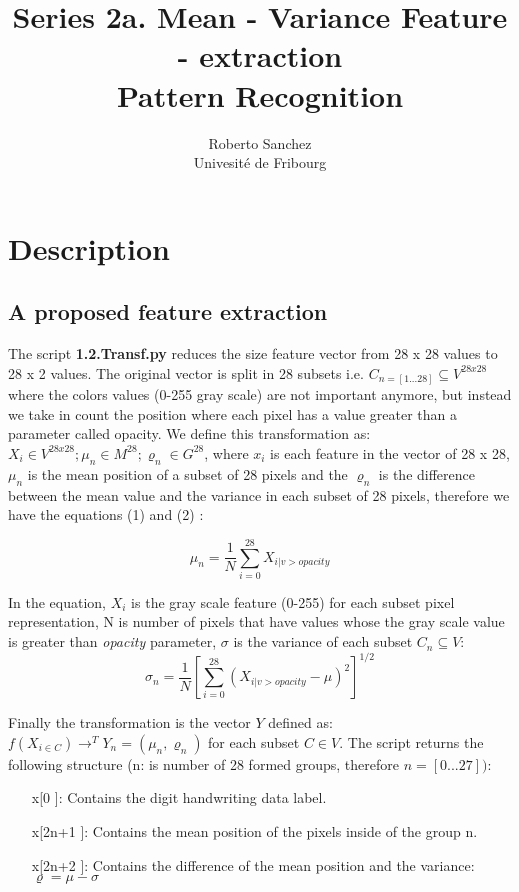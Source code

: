 \documentclass[11pt,a4paper]{article}
\title{Series 2a. Mean - Variance Feature - extraction  \\ Pattern Recognition }
\author{Roberto Sanchez \\ Univesité de Fribourg}
\begin{document}
\maketitle 
\section{Description}

\subsection{A proposed feature extraction} 

The script \textbf{1.2.Transf.py} reduces the size feature vector from 28 x 28 values to 28 x 2 values. The original vector is split in 28 subsets i.e. $C_{n=[1...28]} \subseteq V^{28x28} $  where the colors values (0-255 gray scale) are not important anymore, but instead we take in count the position where each pixel has a value greater than a parameter called opacity. We define this transformation as: $X_{i} \in V^{28x28} ; \mu_{n} \in M^{28} ; \varrho_{n} \in G^{28} $, where $x_{i}$ is each feature in the vector of 28 x 28, $\mu_{n}$ is the mean position of a subset of 28 pixels and the $\varrho_{n}$ is the difference between the mean value and the variance in each subset of 28 pixels, therefore we have the equations (1) and (2) : 
   
\begin{equation}
\displaystyle  \mu_{n} = \frac{1}{N}\sum_{i=0}^{28} X_{i|v > opacity}
\end{equation} 
 

In the equation, $X_{i}$ is the gray scale feature (0-255) for each subset pixel representation, N is number of pixels that have values whose the gray scale value is greater than \textit{opacity} parameter, $\sigma$ is the variance of each subset $C_{n} \subseteq V$:  \\

\begin{equation}
\displaystyle  \sigma_{n} = \frac{1}{N}\left[ \sum_{i=0}^{28} (X_{i|v > opacity} - \mu)^2 \right] ^{1/2}
\end{equation}

Finally the transformation is the vector $Y$ defined as: $f(X_{i \in C}) \rightarrow^{T} Y_{n}=(\mu_{n},\varrho_{n})$ for each subset $C \in V$. The script returns the following structure (n: is number of 28 formed groups, therefore $n = [0... 27])$:

\begin{itemize}
	\item[x[0]]: Contains the digit handwriting data label.   	
	\item[x[2n+1]]: Contains the mean position of the pixels inside of the group n.
	\item[x[2n+2]]: Contains the difference of the mean position and the variance: $\varrho = \mu - \sigma $ 
\end{itemize}
\end{document}
